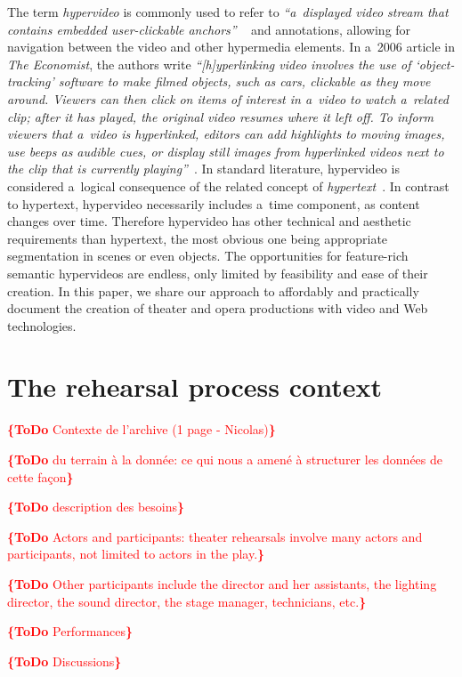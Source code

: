 \documentclass[conference]{IEEEtran}
\newcommand{\todo}[1]{\noindent\textcolor{red}{{\bf \{ToDo} #1{\bf \}}}}
\begin{document}
The term \emph{hypervideo} is commonly used to refer to
\textit{``a~displayed video stream that contains embedded user-clickable anchors''}%
~\cite{sawhney1996hypercafe,smith2002extensible}
and annotations, allowing for navigation between the video and other hypermedia elements.
In a~2006 article in \emph{The Economist}, the authors write 
\textit{``[h]yperlinking video involves the use of `object-tracking' software
to make filmed objects, such as cars, clickable as they move around.
Viewers can then click on items of interest in a~video
to watch a~related clip; after it has played,
the original video resumes where it left off.
To inform viewers that a~video is hyperlinked,
editors can add highlights to moving images, use beeps as audible cues,
or display still images from hyperlinked videos
next to the clip that is currently playing''}~\cite{economist2006hypervideo}.
In standard literature, hypervideo is considered a~logical consequence
of the related concept of \emph{hypertext}~\cite{bernerslee1990hypertext}.
In contrast to hypertext, hypervideo necessarily includes a~time component,
as content changes over time.
Therefore hypervideo has other technical and aesthetic requirements
than hypertext, the most obvious one being appropriate segmentation in scenes
or even objects.
The opportunities for feature-rich semantic hypervideos are endless,
only limited by feasibility and ease of their creation.
In this paper, we share our approach to affordably and practically document
the creation of theater and opera productions with video and Web technologies.


\section{The rehearsal process context}

\todo{Contexte de l'archive (1 page - Nicolas)}

\todo{du terrain à la donnée: ce qui nous a amené à structurer les données de cette façon}

\todo{description des besoins}

\todo{Actors and participants:  theater rehearsals involve many actors and participants, not limited to actors in the play.}

\todo{Other participants include the director and her assistants, the lighting director, the sound director, the stage manager, technicians, etc.}

\todo{Performances}

\todo{Discussions}
\end{document}
